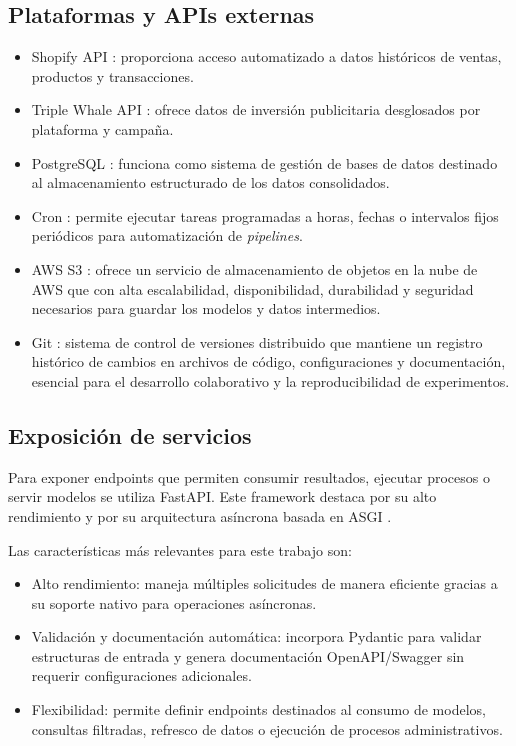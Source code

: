 \subsection{Plataformas y APIs externas}
\begin{itemize}
	\item Shopify API \citep{shopify}: proporciona acceso automatizado a datos históricos de ventas, productos y transacciones.
	
	\item Triple Whale API \citep{triplewhale}: ofrece datos de inversión publicitaria desglosados por plataforma y campaña.
	
	\item PostgreSQL \citep{postgresql_docs}: funciona como sistema de gestión de bases de datos destinado al almacenamiento estructurado de los datos consolidados.

	\item Cron \citep{cron_docs}: permite ejecutar tareas programadas a horas, fechas o intervalos fijos periódicos para automatización de \textit{pipelines}.
	
	\item AWS S3 \citep{aws_s3}: ofrece un servicio de almacenamiento de objetos en la nube de AWS que con alta escalabilidad, disponibilidad, durabilidad y seguridad necesarios para guardar los modelos y datos intermedios.
	
	\item Git \citep{git_pro}: sistema de control de versiones distribuido que mantiene un registro histórico de cambios en archivos de código, configuraciones y documentación, esencial para el desarrollo colaborativo y la reproducibilidad de experimentos.
\end{itemize}


\subsection{Exposición de servicios}
Para exponer endpoints que permiten consumir resultados, ejecutar procesos o servir modelos se utiliza FastAPI. Este framework destaca por su alto rendimiento y por su arquitectura asíncrona basada en ASGI \citep{asgi}.

Las características más relevantes para este trabajo son:
\begin{itemize}
	\item Alto rendimiento: maneja múltiples solicitudes de manera eficiente gracias a su soporte nativo para operaciones asíncronas.
	\item Validación y documentación automática: incorpora Pydantic  \citep{pydantic} para validar estructuras de entrada y genera documentación OpenAPI/Swagger \citep{swagger} sin requerir configuraciones adicionales.
	\item Flexibilidad: permite definir endpoints destinados al consumo de modelos, consultas filtradas, refresco de datos o ejecución de procesos administrativos.
\end{itemize}


